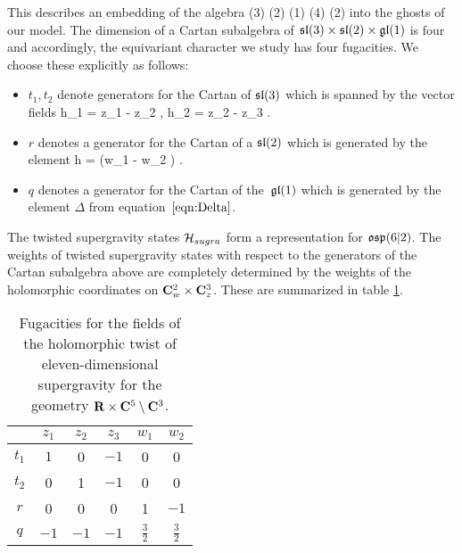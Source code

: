 This describes an embedding of the algebra 
\beqn\label{eqn:gut2}
(3) \times {}(2) \times {}(1) \subset {}(4) \times {}(2) 
\eeqn
into the ghosts of our model.
The dimension of a Cartan subalgebra of $\mathfrak{sl}(3) \times \mathfrak{sl}(2) \times \mathfrak{gl}(1)$ is four and accordingly, the equivariant character we study has four fugacities.
We choose these explicitly as follows:
\begin{itemize}
  \item $t_{1}, t_{2}$ denote generators for the Cartan of $\mathfrak{sl}(3)$ which is spanned by the vector fields
  \beqn
  h_1 = z_1  - z_2  , \quad h_2 = z_2  - z_3 .
  \eeqn
  \item $r$ denotes a generator for the Cartan of a $\mathfrak{sl}(2)$ which is generated by the element 
  \beqn
  \label{eqn:hCartan}
  h =  \left(w_1  - w_2 \right) .
  \eeqn
\item $q$ denotes a generator for the Cartan of the~$\mathfrak{gl}(1)$ which is generated by the element $\Delta$ from equation~$\eqref{eqn:Delta}$. 
\end{itemize}

The twisted supergravity states $\mathcal H_{sugra}$ form a representation for $\mathfrak{osp}(6|2)$. 
The weights of twisted supergravity states with respect to the generators of the Cartan subalgebra above are completely determined by the weights of the holomorphic coordinates on $\mathbf{C}^2_w \times \mathbf{C}^3_z$.
These are summarized in table \ref{tbl:sugraM5}.

\begin{table}
\begin{center}
\begin{tabular}{c c c c c c}
  & $z_{1}$ & $z_{2}$ & $z_{3}$ & $w_{1}$ & $w_{2}$ \\
  \hline
  $t_{1}$ & $1$ & 0 & $-1$ & 0 & 0 \\
  $t_{2}$ & 0 & 1 & $-1$ & 0 & 0 \\
  $r$ & 0 & 0 & 0 & 1 & $-1$ \\
  $q$ & $-1$ & $-1$ & $-1$ & $\frac{3}{2}$ & $\frac{3}{2}$
\end{tabular}
\caption{Fugacities for the fields of the holomorphic twist of eleven-dimensional supergravity for the geometry $\mathbf{R} \times \mathbf{C}^5 \setminus \mathbf{C}^3$.}
\label{tbl:sugraM5}
\end{center}
\end{table}

